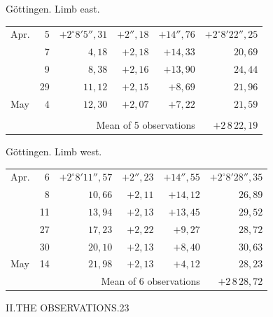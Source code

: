 \noindent\begin{minipage}[t]{.495\textwidth}\centering Göttingen. Limb east.\par\smallskip
{\scriptsize\setlength{\tabcolsep}{1pt}\renewcommand{\arraystretch}{1.2}\begin{tabular}{lr|r|r|r|r|}
Apr.&5&$+2^\circ8'5''{,}31$&$+2''{,}18$&$+14''{,}76$&$+2^\circ8'22''{,}25$\\
&7&$4{,}18$&$+2{,}18$&$+14{,}33$&$20{,}69$\\
&9&$8{,}38$&$+2{,}16$&$+13{,}90$&$24{,}44$\\
&29&$11{,}12$&$+2{,}15$&$+8{,}69$&$21{,}96$\\
May&4&$12{,}30$&$+2{,}07$&$+7{,}22$&$21{,}59$\\
&&&&&\\
\cline{6-6}\multicolumn{5}{r}{Mean of 5 observations}&$+2\,8\,22{,}19$
\end{tabular}}\end{minipage}\hfill\begin{minipage}[t]{.495\textwidth}\centering Göttingen. Limb west.\par\smallskip
{\scriptsize\setlength{\tabcolsep}{1pt}\renewcommand{\arraystretch}{1.2}\begin{tabular}{lr|r|r|r|r}
Apr.&6&$+2^\circ8'11''{,}57$&$+2''{,}23$&$+14''{,}55$&$+2^\circ8'28''{,}35$\\
&8&$10{,}66$&$+2{,}11$&$+14{,}12$&$26{,}89$\\
&11&$13{,}94$&$+2{,}13$&$+13{,}45$&$29{,}52$\\
&27&$17{,}23$&$+2{,}22$&$+9{,}27$&$28{,}72$\\
&30&$20{,}10$&$+2{,}13$&$+8{,}40$&$30{,}63$\\
May&14&$21{,}98$&$+2{,}13$&$+4{,}12$&$28{,}23$\\
\cline{6-6}\multicolumn{5}{r}{Mean of 6 observations}&$+2\,8\,28{,}72$
\end{tabular}}\end{minipage}
\par\vspace{4mm}

\clearpage
\noindent\mbox{}\hfill II.\quad THE OBSERVATIONS.\hfill 23\par

